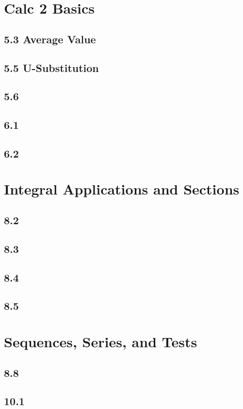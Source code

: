 \documentclass{article}
\begin{document}
    \section{Calc 2 Basics}
        \subsection*{5.3 Average Value}
        \subsection*{5.5 U-Substitution}
        \subsection*{5.6 }
        \subsection*{6.1 }
        \subsection*{6.2 }
    \section{Integral Applications and Sections}
        \subsection*{8.2}
        \subsection*{8.3}
        \subsection*{8.4}
        \subsection*{8.5}
    \section{Sequences, Series, and Tests}
        \subsection*{8.8}
        \subsection*{10.1}
\end{document}
